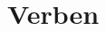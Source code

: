 \documentclass[11pt]{scrartcl}
\begin{document}
\section*{Verben}

\begin{multicols}{3}



\end{multicols}
\end{document}
